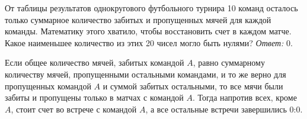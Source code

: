 \problem
От таблицы результатов однокругового футбольного турнира 10 команд осталось
только суммарное количество забитых и пропущенных мячей для каждой команды.
Математику этого хватило, чтобы восстановить счет в каждом матче.
Какое наименьшее количество из этих 20 чисел могло быть нулями?
\solution
\emph{Ответ:} 0.
\par
Если общее количество мячей, забитых командой $A$, равно суммарному количеству
мячей, пропущенными остальными командами, и то же верно для пропущенных
командой $A$ и суммой забитых остальными, то все мячи были забиты и пропущены
только в матчах с командой $A$.
Тогда напротив всех, кроме $A$, стоит счет во встрече с командой $A$, а все
остальные встречи завершились 0:0.
\endproblem
